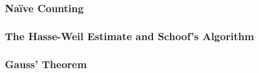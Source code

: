 \subsubsection{Naïve Counting} %
\lipsum[1-3]
\subsubsection{The Hasse-Weil Estimate and Schoof's Algorithm}

\subsubsection{Gauss' Theorem}

